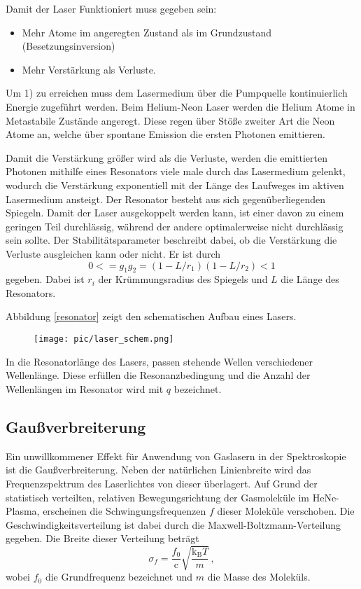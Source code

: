 Damit der Laser Funktioniert muss gegeben sein:
\begin{itemize}
	\item Mehr Atome im angeregten Zustand als im Grundzustand (Besetzungsinversion)
	\item Mehr Verstärkung als Verluste.
\end{itemize}

Um 1) zu erreichen muss dem Lasermedium über die Pumpquelle kontinuierlich Energie zugeführt werden.
Beim Helium-Neon Laser werden die Helium Atome in Metastabile Zustände angeregt.
Diese regen über Stöße zweiter Art die Neon Atome an, welche über spontane Emission die ersten Photonen emittieren.

Damit die Verstärkung größer wird als die Verluste, werden die emittierten Photonen mithilfe eines Resonators viele male durch das Lasermedium gelenkt, wodurch die Verstärkung exponentiell mit der Länge des Laufweges im aktiven Lasermedium ansteigt.
Der Resonator besteht aus sich gegenüberliegenden Spiegeln.
Damit der Laser ausgekoppelt werden kann, ist einer davon zu einem geringen Teil durchlässig, während der andere optimalerweise nicht durchlässig sein sollte.
Der Stabilitätsparameter beschreibt dabei, ob die Verstärkung die Verluste ausgleichen kann oder nicht. 
Er ist durch 
\begin{equation*}
	0 <= g_1 g_2 = (1-L/r_1)(1-L/r_2) < 1
\end{equation*}
gegeben.
Dabei ist $r_i$ der Krümmungsradius des Spiegels und $L$ die Länge des Resonators.

Abbildung \ref{resonator} zeigt den schematischen Aufbau eines Lasers.
\begin{figure}[h!]
	\texttt{[image: pic/laser\_schem.png]}
\end{figure}

In die Resonatorlänge des Lasers, passen stehende Wellen verschiedener Wellenlänge.
Diese erfüllen die Resonanzbedingung und die Anzahl der Wellenlängen im Resonator wird mit $q$ bezeichnet.

\subsection{Gaußverbreiterung}
\label{subsec:gaußverbreiterung}
Ein unwillkommener Effekt für Anwendung von Gaslasern in der Spektroskopie ist
die Gaußverbreiterung.
Neben der natürlichen Linienbreite wird das Frequenzspektrum des Laserlichtes
von dieser überlagert.
Auf Grund der statistisch verteilten, relativen Bewegungsrichtung der
Gasmoleküle im HeNe-Plasma, erscheinen die Schwingungsfrequenzen $f$ dieser
Moleküle verschoben.
Die Geschwindigkeitsverteilung ist dabei durch die Maxwell-Boltzmann-Verteilung
gegeben. Die Breite dieser Verteilung beträgt
\begin{equation}
\label{eq:sigma_maxwell_boltzmann}
    \sigma_f = \frac{f_0}{\mathrm{c}}\sqrt{\frac{\mathrm{k}_\text{B}T}{m}}\,,
\end{equation}
wobei $f_0$ die Grundfrequenz bezeichnet und $m$ die Masse des Moleküls.